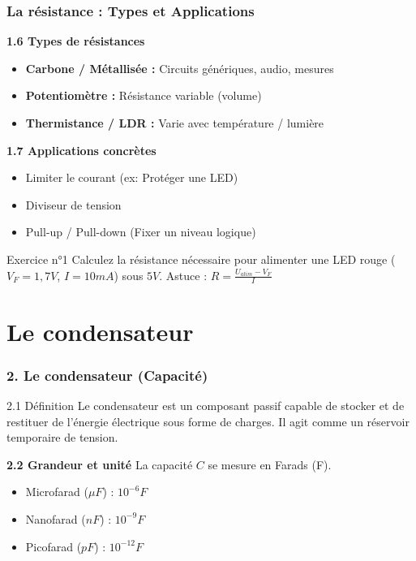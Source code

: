 \documentclass[11pt]{beamer}
\begin{document}
\begin{frame}
    \frametitle{La résistance : Types et Applications}
    \textbf{1.6 Types de résistances}
    \begin{itemize}
        \item \textbf{Carbone / Métallisée :} Circuits génériques, audio, mesures
        \item \textbf{Potentiomètre :} Résistance variable (volume)
        \item \textbf{Thermistance / LDR :} Varie avec température / lumière
    \end{itemize}
    
    \vspace{0.5cm}
    \textbf{1.7 Applications concrètes}
    \begin{itemize}
        \item Limiter le courant (ex: Protéger une LED)
        \item Diviseur de tension
        \item Pull-up / Pull-down (Fixer un niveau logique)
    \end{itemize}
    
    \begin{alertblock}{Exercice n°1}
        Calculez la résistance nécessaire pour alimenter une LED rouge ($V_F = 1,7V$, $I = 10mA$) sous $5V$. Astuce : $R = \frac{U_{alim} - V_F}{I}$
    \end{alertblock}
\end{frame}

\section{Le condensateur}
\begin{frame}
    \frametitle{2. Le condensateur (Capacité)}
    \begin{block}{2.1 Définition}
        Le condensateur est un composant passif capable de stocker et de restituer de l'énergie électrique sous forme de charges. Il agit comme un réservoir temporaire de tension.
    \end{block}
    
    \textbf{2.2 Grandeur et unité}
    La capacité $C$ se mesure en Farads (F). 
    \begin{itemize}
        \item Microfarad ($\mu F$) : $10^{-6}F$
        \item Nanofarad ($nF$) : $10^{-9}F$
        \item Picofarad ($pF$) : $10^{-12}F$
    \end{itemize}
\end{frame}
\end{document}
